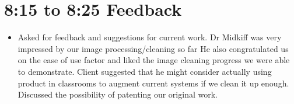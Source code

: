 \documentclass[]{article}
\begin{document}
	\section*{8:15 to 8:25 Feedback}
		\begin{itemize}
			\item Asked for feedback and suggestions for current work.
				\subitem Dr Midkiff was very impressed by our image processing/cleaning so far
				\subitem He also congratulated us on the ease of use factor and liked the image cleaning progress we were able to demonstrate.
				\subitem Client suggested that he might consider actually using product in classrooms to augment current systems if we clean it up enough.
				\subitem Discussed the possibility of patenting our original work.
		\end{itemize}
\end{document}
